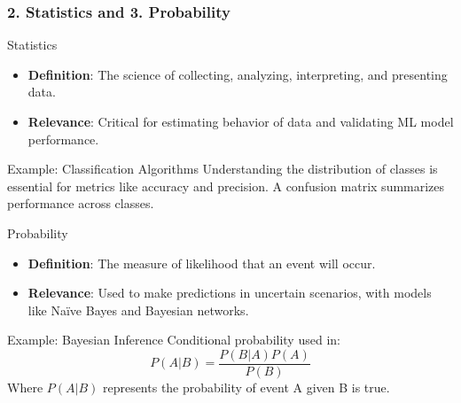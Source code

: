 \documentclass{beamer}
\begin{document}
\begin{frame}[fragile]
    \frametitle{2. Statistics and 3. Probability}
    
    \begin{block}{Statistics}
        \begin{itemize}
            \item \textbf{Definition}: The science of collecting, analyzing, interpreting, and presenting data.
            \item \textbf{Relevance}: Critical for estimating behavior of data and validating ML model performance.
        \end{itemize}
        
        \begin{block}{Example: Classification Algorithms}
            Understanding the distribution of classes is essential for metrics like accuracy and precision. A confusion matrix summarizes performance across classes.
        \end{block}
    \end{block}
    
    \begin{block}{Probability}
        \begin{itemize}
            \item \textbf{Definition}: The measure of likelihood that an event will occur.
            \item \textbf{Relevance}: Used to make predictions in uncertain scenarios, with models like Naïve Bayes and Bayesian networks.
        \end{itemize}
        
        \begin{block}{Example: Bayesian Inference}
            Conditional probability used in:
            \begin{equation}
                P(A|B) = \frac{P(B|A)P(A)}{P(B)}
            \end{equation}
            Where $P(A|B)$ represents the probability of event A given B is true.
        \end{block}
    \end{block}
\end{frame}
\end{document}
